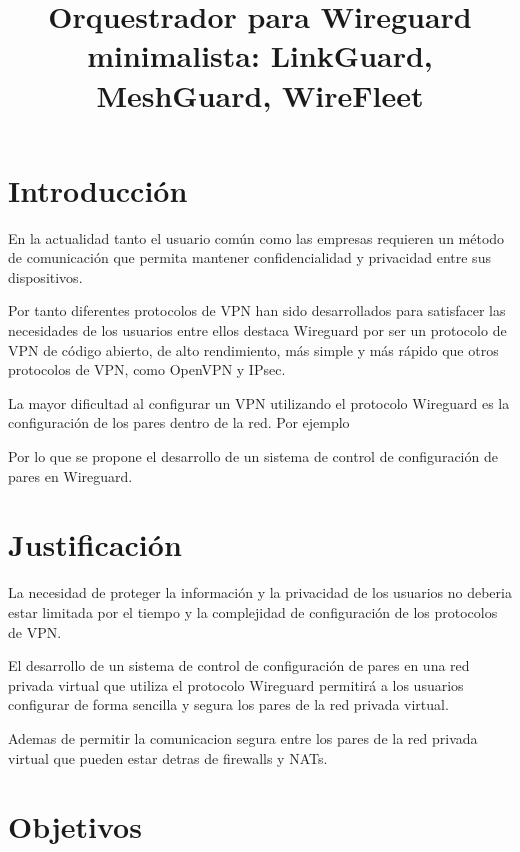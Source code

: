 \documentclass{article}
\title{Orquestrador para Wireguard minimalista: LinkGuard, MeshGuard, WireFleet}
\begin{document}
\maketitle


\section{Introducción}

En la actualidad tanto el usuario común como las empresas requieren un método de comunicación que permita mantener confidencialidad y privacidad entre sus dispositivos. 



Por tanto diferentes protocolos de VPN han sido desarrollados para satisfacer las necesidades de los usuarios entre ellos destaca Wireguard por ser un protocolo de VPN de código abierto, de alto rendimiento, más simple y más rápido que otros protocolos de VPN, como OpenVPN y IPsec.


La mayor dificultad al configurar un VPN utilizando el protocolo Wireguard es la configuración de los pares dentro de la red. Por ejemplo 

Por lo que se propone el desarrollo de un sistema de control de configuración de pares en Wireguard.

\section{Justificación}
    
La necesidad de proteger la información y la privacidad de los usuarios no deberia estar limitada por el tiempo y la complejidad de configuración de los protocolos de VPN. 



El desarrollo de un sistema de control de configuración de pares en una red privada virtual que utiliza el protocolo Wireguard permitirá a los usuarios configurar de forma sencilla y segura los pares de la red privada virtual.

Ademas de permitir la comunicacion segura entre los pares de la red privada virtual que pueden estar detras de firewalls y NATs.

\section{Objetivos}
\end{document}
